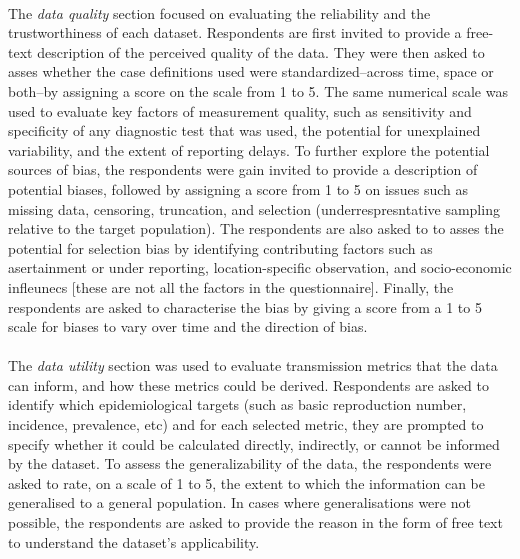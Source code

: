 \documentclass{article}
\begin{document}
\paragraph{}The \textit{data quality} section focused on evaluating the reliability and the trustworthiness of each dataset. Respondents are first invited to provide a free-text description of the perceived quality of the data. They were then asked to asses whether the case definitions used were standardized--across time, space or both--by assigning a score on the scale from 1 to 5. The same numerical scale was used to evaluate key factors of measurement quality, such as sensitivity and specificity of any diagnostic test that was used, the potential for unexplained variability, and the extent of reporting delays. To further explore the potential sources of bias, the respondents were gain invited to provide a description of potential biases, followed by assigning a score from 1 to 5 on issues such as missing data, censoring, truncation, and selection (underrespresntative sampling relative to the target population). The respondents are also asked to to asses the potential for selection bias by identifying contributing factors such as asertainment or under reporting, location-specific observation, and socio-economic infleunecs [these are not all the factors in the questionnaire]. Finally, the respondents are asked to characterise the bias by giving a score from a 1 to 5 scale for biases to vary over time and the direction of bias. 

\paragraph{} The \textit{data utility} section was used to evaluate transmission metrics that the data can inform, and how these metrics could be derived. Respondents are asked to identify which epidemiological targets (such as basic reproduction number, incidence, prevalence, etc) and for each selected metric, they are prompted to specify whether it could be calculated directly, indirectly, or cannot be informed by the dataset. To assess the generalizability of the data, the respondents were asked to rate, on a scale of 1 to 5, the extent to which the information can be generalised to a general population. In cases where generalisations were not possible, the respondents are asked to provide the reason in the form of free text to understand the dataset's applicability. 
\end{document}
